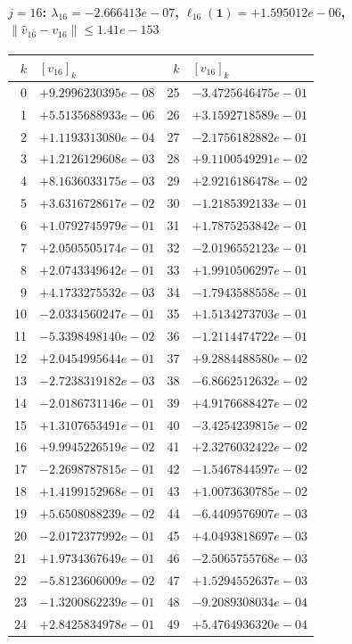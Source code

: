 \documentclass[11pt]{article}
\begin{document}
\paragraph{$j = 16$: $\lambda_{16} = -2.666413e-07$, \quad $\ell_{16}(\mathbf{1}) = +1.595012e-06$, \quad $\|\hat v_{16} - v_{16}\| \leq 1.41e-153$}
\begin{center}
{\footnotesize
\begin{tabular}{r@{\;\;}l@{\quad}r@{\;\;}l}
\toprule
$k$ & $[v_{16}]_k$ & $k$ & $[v_{16}]_k$ \\
\midrule
0 & $+9.2996230395e-08$ & 25 & $-3.4725646475e-01$ \\
1 & $+5.5135688933e-06$ & 26 & $+3.1592718589e-01$ \\
2 & $+1.1193313080e-04$ & 27 & $-2.1756182882e-01$ \\
3 & $+1.2126129608e-03$ & 28 & $+9.1100549291e-02$ \\
4 & $+8.1636033175e-03$ & 29 & $+2.9216186478e-02$ \\
5 & $+3.6316728617e-02$ & 30 & $-1.2185392133e-01$ \\
6 & $+1.0792745979e-01$ & 31 & $+1.7875253842e-01$ \\
7 & $+2.0505505174e-01$ & 32 & $-2.0196552123e-01$ \\
8 & $+2.0743349642e-01$ & 33 & $+1.9910506297e-01$ \\
9 & $+4.1733275532e-03$ & 34 & $-1.7943588558e-01$ \\
10 & $-2.0334560247e-01$ & 35 & $+1.5134273703e-01$ \\
11 & $-5.3398498140e-02$ & 36 & $-1.2114474722e-01$ \\
12 & $+2.0454995644e-01$ & 37 & $+9.2884488580e-02$ \\
13 & $-2.7238319182e-03$ & 38 & $-6.8662512632e-02$ \\
14 & $-2.0186731146e-01$ & 39 & $+4.9176688427e-02$ \\
15 & $+1.3107653491e-01$ & 40 & $-3.4254239815e-02$ \\
16 & $+9.9945226519e-02$ & 41 & $+2.3276032422e-02$ \\
17 & $-2.2698787815e-01$ & 42 & $-1.5467844597e-02$ \\
18 & $+1.4199152968e-01$ & 43 & $+1.0073630785e-02$ \\
19 & $+5.6508088239e-02$ & 44 & $-6.4409576907e-03$ \\
20 & $-2.0172377992e-01$ & 45 & $+4.0493818697e-03$ \\
21 & $+1.9734367649e-01$ & 46 & $-2.5065755768e-03$ \\
22 & $-5.8123606009e-02$ & 47 & $+1.5294552637e-03$ \\
23 & $-1.3200862239e-01$ & 48 & $-9.2089308034e-04$ \\
24 & $+2.8425834978e-01$ & 49 & $+5.4764936320e-04$ \\
\bottomrule
\end{tabular}
}
\end{center}
\end{document}
